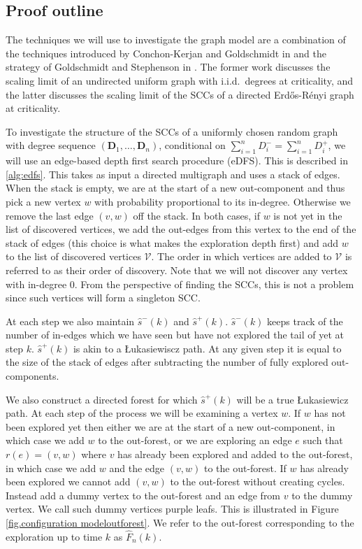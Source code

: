 \subsection{Proof outline}

\def \exploredvertices {\mathcal V}
\def \explorededges {\mathcal E}
\def \forest {F}
\def \edgestack {\mathcal Q}

The techniques we will use to investigate the graph model are a combination of the techniques introduced by Conchon-Kerjan and Goldschmidt in \cite{conchon--kerjanStableGraphMetric2020} and the strategy of Goldschmidt and Stephenson in \cite{goldschmidtScalingLimitCritical2019}. The former work discusses the scaling limit of an undirected uniform graph with i.i.d.\ degrees at criticality, and the latter discusses the scaling limit of the SCCs of a directed Erd\H{o}s-Rényi graph at criticality.

To investigate the structure of the SCCs of a uniformly chosen random graph with degree sequence $(\mathbf{D}_1,\dots,\mathbf{D}_n)$, conditional on $\sum_{i=1}^n D^-_i=\sum_{i=1}^n D^+_i$, we will use an edge-based depth first search procedure (eDFS). This is described in \cref{alg:edfs}. This takes as input a directed multigraph and uses a stack of edges. When the stack is empty, we are at the start of a new out-component and thus pick a new vertex $w$ with probability proportional to its in-degree. Otherwise we remove the last edge $(v, w)$ off the stack. In both cases, if $w$ is not yet in the list of discovered vertices, we add the out-edges from this vertex to the end of the stack of edges (this choice is what makes the exploration depth first) and add $w$ to the list of discovered vertices $\exploredvertices$.  The order in which vertices are added to $\exploredvertices$ is referred to as their order of discovery. Note that we will not discover any vertex with in-degree 0. From the perspective of finding the SCCs, this is not a problem since such vertices will form a singleton SCC.

At each step we also maintain $\hat{s}^-(k)$ and $\hat{s}^+(k)$. $\hat{s}^-(k)$ keeps track of the number of in-edges which we have seen but have not explored the tail of yet at step $k$. $\hat{s}^+(k)$ is akin to a \L{}ukasiewiscz path. At any given step it is equal to the size of the stack of edges after subtracting the number of fully explored out-components.

We also construct a directed forest for which $\hat{s}^+(k)$ will be a true \L{}ukasiewicz path. At each step of the process we will be examining a vertex $w$. If $w$ has not been explored yet then either we are at the start of a new out-component, in which case we add $w$ to the out-forest, or we are exploring an edge $e$ such that $r(e) = (v, w)$ where $v$ has already been explored and added to the out-forest, in which case we add $w$ and the edge $(v, w)$ to the out-forest. If $w$ has already been explored we cannot add $(v, w)$ to the out-forest without creating cycles. Instead add a dummy vertex to the out-forest and an edge from $v$ to the dummy vertex. We call such dummy vertices purple leafs. This is illustrated in Figure \ref{fig.configuration modeloutforest}. We refer to the out-forest corresponding to the exploration up to time $k$ as $\hat{F}_n(k)$.


